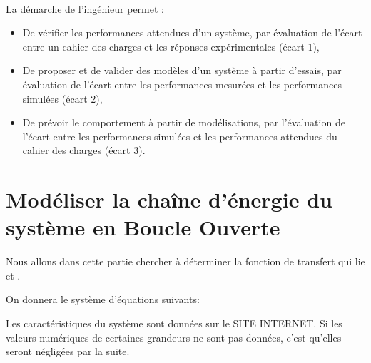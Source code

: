 
%



 \\

\graphicspath{{../../img/}}
\begin{center}
\def\svgwidth{\columnwidth}

\end{center}

La démarche de l’ingénieur permet :
\begin{itemize}
 \item De vérifier les performances attendues d’un système, par évaluation de l’écart entre un cahier des charges et les réponses expérimentales (écart 1),
 \item De proposer et de valider des modèles d’un système à partir d’essais, par évaluation de l’écart entre les performances mesurées et les performances simulées (écart 2),
 \item De prévoir le comportement à partir de modélisations, par l’évaluation de l’écart entre les performances simulées et les performances attendues du cahier des charges (écart 3).
\end{itemize}


\newpage


\ifdef{\public}{\cleardoublepage}{}

\section{Modéliser la chaîne d'énergie du système en Boucle Ouverte}

Nous allons dans cette partie chercher à déterminer la fonction de transfert qui lie \entree et \sortie.

On donnera le système d'équations suivants: \\
\systequations

Les caractéristiques du système sont données sur le SITE INTERNET. Si les valeurs numériques de certaines grandeurs ne sont pas données, c'est qu'elles seront négligées par la suite.

